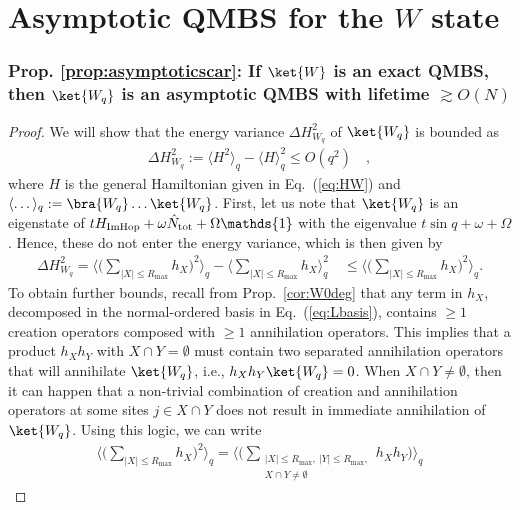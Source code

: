 \documentclass[prx,letterpaper,aps,superscriptaddress,floatfix,twocolumn,nofootinbib]{revtex4-2}
\theoremstyle{definition}
\begin{document}
\section{Asymptotic QMBS for the $W$ state}
\label{app:asymptoticscar}
%
\subsubsection{Prop. \ref{prop:asymptoticscar}: If $\ket{W}$ is an exact QMBS, then $\ket{W_q}$ is an asymptotic QMBS with lifetime $\gtrsim O(N)$}
%
\begin{proof}
    We will show that the energy variance $\Delta H_{W_q}^2$ of $\ket{W_q}$ is bounded as
    \begin{align}
        \Delta H_{W_q}^2 :=\langle H^2\rangle_q-\langle H\rangle_q^2\leq O(q^2)\quad,
    \end{align}
    where $H$ is the general Hamiltonian given in Eq.~(\ref{eq:HW}) and $\langle \dots \rangle_q := \bra{W_q} \dots \ket{W_q}$.
    First, let us note that $\ket{W_q}$ is an eigenstate of $t H_{\rm ImHop}+\omega\hat{N}_{\rm tot}+\Omega\mathds{1}$ with the eigenvalue $t\sin q +\omega+\Omega$.
    Hence, these do not enter the energy variance, which is then given by
    \begin{align}
        \Delta H_{W_q}^2 = \big\langle \big( \sum_{|X|\leq R_{\text{max}}}h_X \big)^2 \big\rangle_q - \big\langle \sum_{|X|\leq R_{\text{max}}} h_X \big\rangle_q^2 \quad \leq \big\langle \big( \sum_{|X|\leq R_{\text{max}}}h_X \big)^2 \big\rangle_q.
    \end{align}
    To obtain further bounds, recall from Prop.~\ref{cor:W0deg} that any term in $h_X$, decomposed in the normal-ordered basis in Eq.~(\ref{eq:Lbasis}), contains $\geq 1$ creation operators composed with $\geq 1$ annihilation operators.
    This implies that a product $h_X h_Y$ with $X \cap Y = \emptyset$ must contain two separated annihilation operators that will annihilate $\ket{W_q}$, i.e., $h_X h_Y \ket{W_q} = 0$.
    When $X\cap Y\neq\emptyset$, then it can happen that a non-trivial combination of creation and annihilation operators at some sites $j \in X\cap Y$ does not result in immediate annihilation of $\ket{W_q}$.
    Using this logic, we can write
    \begin{align}
        \big\langle \big(\sum_{|X|\leq R_{\text{max}}}h_X \big)^2 \big\rangle_q 
        =  \big\langle \big(\sum_{\substack{|X|\leq R_{\text{max}},~ |Y| \leq R_{\text{max}},\\ X \cap Y \neq \emptyset}} h_X h_Y \big) \big\rangle_q 

\end{align}
\end{proof}
\end{document}
